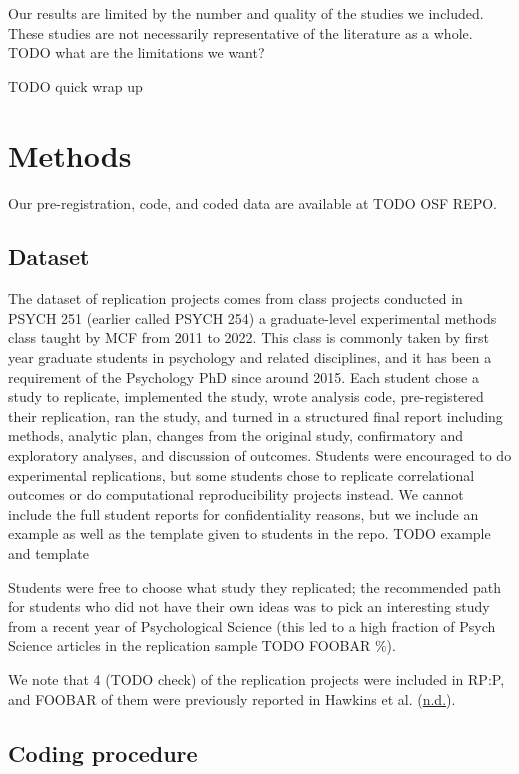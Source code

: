 \documentclass[
  english,
  a4paper,
]{article}
\begin{document}
Our results are limited by the number and quality of the studies we included. These studies are not necessarily representative of the literature as a whole. TODO what are the limitations we want?

TODO quick wrap up

\hypertarget{methods}{%
\section{Methods}\label{methods}}

Our pre-registration, code, and coded data are available at TODO OSF REPO.

\hypertarget{dataset}{%
\subsection{Dataset}\label{dataset}}

The dataset of replication projects comes from class projects conducted in PSYCH 251 (earlier called PSYCH 254) a graduate-level experimental methods class taught by MCF from 2011 to 2022. This class is commonly taken by first year graduate students in psychology and related disciplines, and it has been a requirement of the Psychology PhD since around 2015. Each student chose a study to replicate, implemented the study, wrote analysis code, pre-registered their replication, ran the study, and turned in a structured final report including methods, analytic plan, changes from the original study, confirmatory and exploratory analyses, and discussion of outcomes. Students were encouraged to do experimental replications, but some students chose to replicate correlational outcomes or do computational reproducibility projects instead. We cannot include the full student reports for confidentiality reasons, but we include an example as well as the template given to students in the repo. TODO example and template

Students were free to choose what study they replicated; the recommended path for students who did not have their own ideas was to pick an interesting study from a recent year of Psychological Science (this led to a high fraction of Psych Science articles in the replication sample TODO FOOBAR \%).

We note that 4 (TODO check) of the replication projects were included in RP:P, and FOOBAR of them were previously reported in Hawkins et al. (\protect\hyperlink{ref-hawkins}{n.d.}).

\hypertarget{coding-procedure}{%
\subsection{Coding procedure}\label{coding-procedure}}
\end{document}
